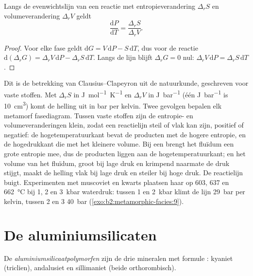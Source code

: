 \begin{proposition}\label{prop:b2:metamorphic-facies:clapeyron}
Langs de evenwichtslijn van een reactie met entropieverandering $\Delta_r S$ en
volumeverandering $\Delta_r V$ geldt
\[
\frac{\mathrm dP}{\mathrm dT} = \frac{\Delta_r S}{\Delta_r V}.
\]
\end{proposition}

\begin{proof}
Voor elke fase geldt $\mathrm dG = V\,\mathrm dP - S\,\mathrm dT$, dus voor de reactie
$\mathrm d(\Delta_r G) = \Delta_r V\,\mathrm dP - \Delta_r S\,\mathrm dT$. Langs de lijn
blijft $\Delta_r G = 0$ nul: $\Delta_r V\,\mathrm dP = \Delta_r S\,\mathrm dT$.
\end{proof}

Dit is de betrekking van Clausius--Clapeyron uit de natuurkunde, geschreven voor vaste stoffen. Met
$\Delta_r S$ in \unit{J.mol^{-1}.K^{-1}} en $\Delta_r V$ in \unit{J.bar^{-1}} (één
\unit{J.bar^{-1}} is \qty{10}{cm^3}) komt de helling uit in bar per kelvin. Twee
gevolgen bepalen elk metamorf fasediagram. Tussen vaste stoffen zijn de entropie- en
volumeveranderingen klein, zodat een reactielijn steil of vlak kan zijn, positief of
negatief: de hogetemperatuurkant bevat de producten met de hogere entropie, en de
hogedrukkant die met het kleinere volume. Bij een  brengt het fluïdum
een grote entropie mee, dus de producten liggen aan de hogetemperatuurkant; en het volume
van het fluïdum, groot bij lage druk en krimpend naarmate de druk stijgt, maakt de helling
vlak bij lage druk en steiler bij hoge druk. De reactielijn buigt.
Experimenten met muscoviet en kwarts plaatsen haar op 603, 637 en \qty{662}{\celsius} bij 1,
2 en \qty{3}{kbar} waterdruk: tussen 1 en \qty{2}{kbar} klimt de lijn
\qty{29}{bar} per kelvin, tussen 2 en 3 \qty{40}{bar} (\cref{exo:b2:metamorphic-facies:9}).

\section{De aluminiumsilicaten}\label{sec:b2:metamorphic-facies:al2sio5}

\begin{definition}[Aluminiumsilicaatpolymorfen]\label{def:b2:metamorphic-facies:al2sio5}
De \emph{aluminiumsilicaatpolymorfen} zijn de drie
mineralen met formule : kyaniet (triclien), andalusiet en sillimaniet (beide
orthorombisch).
\end{definition}


